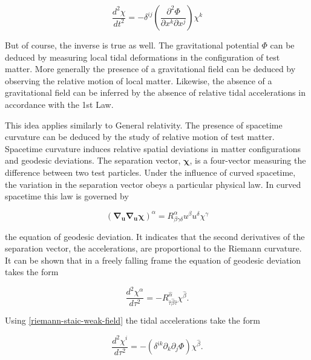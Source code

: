 \documentclass[11pt]{article}
\begin{document}
\begin{equation}
    \label{tidal-acc-newton}
    \frac{d^2 \chi}{dt^2} = - \delta^{ij} \left( \frac{\partial^2 \Phi}{\partial x^k \partial x^j} \right) \chi^k
\end{equation}

But of course, the inverse is true as well. The gravitational potential $\Phi$ can be deduced by measuring local tidal deformations in the configuration of test matter. More generally the presence of a gravitational field can be deduced by observing the relative motion of local matter. Likewise, the absence of a gravitational field can be inferred by the absence of relative tidal accelerations in accordance with the 1st Law.

This idea applies similarly to General relativity. The presence of spacetime curvature can be deduced by the study of relative motion of test matter. Spacetime curvature induces relative spatial deviations in matter configurations and geodesic deviations. The separation vector, $\boldsymbol{\chi}$, is a four-vector measuring the difference between two test particles. Under the influence of curved spacetime, the variation in the separation vector obeys a particular physical law. In curved spacetime this law is governed by

\begin{equation}
    \label{geodesic-equation}
    (\boldsymbol{\nabla}_{\boldsymbol{u}} \boldsymbol{\nabla}_{\boldsymbol{u}} \boldsymbol{\chi})^{\alpha} = R^{\alpha}_{\beta \gamma \delta} u^{\beta} u^{\delta} \chi^{\gamma}
\end{equation}

the equation of geodesic deviation. It indicates that the second derivatives of the separation vector, the accelerations, are proportional to the Riemann curvature. It can be shown that in a freely falling frame the equation of geodesic deviation takes the form

\begin{equation}
    \label{geodesic-eq-LIF}
    \frac{d^2\chi^{\alpha}}{d \tau^2} = - R^{\hat{\alpha}}_{\hat{\tau} \hat{\beta} \hat{\tau}} \chi^{\hat{\beta}}.
\end{equation}

Using \eqref{riemann-staic-weak-field} the tidal accelerations take the form

\begin{equation}
    \label{geodesic-eq-LIF}
    \frac{d^2\chi^{i}}{d \tau^2} = - \left(\delta^{ik} \partial_k \partial_j \Phi \right) \chi^{\hat{\beta}}.
\end{equation}
\end{document}
